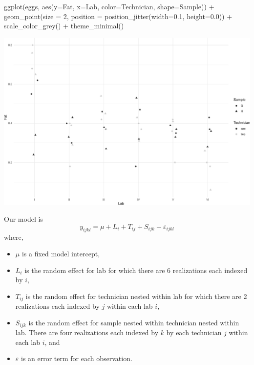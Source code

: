 \documentclass[
  ignorenonframetext,
]{beamer}
\newenvironment{Shaded}{\begin{snugshade}}{\end{snugshade}}
\newcommand{\AttributeTok}[1]{\textcolor[rgb]{0.77,0.63,0.00}{#1}}
\newcommand{\DecValTok}[1]{\textcolor[rgb]{0.00,0.00,0.81}{#1}}
\newcommand{\FloatTok}[1]{\textcolor[rgb]{0.00,0.00,0.81}{#1}}
\newcommand{\FunctionTok}[1]{\textcolor[rgb]{0.00,0.00,0.00}{#1}}
\newcommand{\NormalTok}[1]{#1}
\newcommand{\SpecialCharTok}[1]{\textcolor[rgb]{0.00,0.00,0.00}{#1}}
\begin{document}
\begin{frame}[fragile]{}
\protect\hypertarget{section-11}{}
\tiny

\begin{Shaded}
\begin{Highlighting}[]
\FunctionTok{ggplot}\NormalTok{(eggs, }\FunctionTok{aes}\NormalTok{(}\AttributeTok{y=}\NormalTok{Fat, }\AttributeTok{x=}\NormalTok{Lab, }\AttributeTok{color=}\NormalTok{Technician, }\AttributeTok{shape=}\NormalTok{Sample)) }\SpecialCharTok{+} 
  \FunctionTok{geom\_point}\NormalTok{(}\AttributeTok{size =} \DecValTok{2}\NormalTok{, }\AttributeTok{position =} \FunctionTok{position\_jitter}\NormalTok{(}\AttributeTok{width=}\FloatTok{0.1}\NormalTok{, }\AttributeTok{height=}\FloatTok{0.0}\NormalTok{)) }\SpecialCharTok{+} 
  \FunctionTok{scale\_color\_grey}\NormalTok{() }\SpecialCharTok{+} 
  \FunctionTok{theme\_minimal}\NormalTok{()}
\end{Highlighting}
\end{Shaded}

\includegraphics{week11p2_files/figure-beamer/unnamed-chunk-11-1.pdf}
\end{frame}

\begin{frame}{}
\protect\hypertarget{section-12}{}
Our model is \[
  y_{ijkl} = \mu + L_i + T_{ij} + S_{ijk} + \varepsilon_{ijkl}
\] where,

\begin{itemize}
\item $\mu$ is a fixed model intercept,
\item $L_i$ is the random effect for lab for which there are 6 realizations each indexed by $i$,
\item $T_{ij}$ is the random effect for technician nested within lab for which there are 2 realizations each indexed by $j$ within each lab $i$, 
\item $S_{ijk}$ is the random effect for sample nested within technician nested within lab. There are four realizations each indexed by $k$ by each technician $j$ within each lab $i$, and
\item $\varepsilon$ is an error term for each observation.
\end{itemize}
\end{frame}
\end{document}
